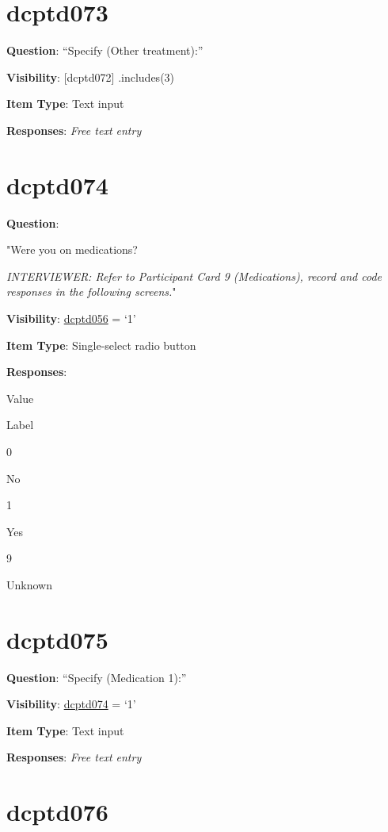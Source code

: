 \documentclass[]{book}
\begin{document}
\hypertarget{dcptd073}{%
\section{dcptd073}\label{dcptd073}}

\textbf{Question}: ``Specify (Other treatment):''

\textbf{Visibility}: {[}dcptd072{]} .includes(3)

\textbf{Item Type}: Text input

\textbf{Responses}: \emph{Free text entry}

\hypertarget{dcptd074}{%
\section{dcptd074}\label{dcptd074}}

\textbf{Question}:

"Were you on medications?

\emph{INTERVIEWER: Refer to Participant Card 9 (Medications), record and code responses in the following screens.}"

\textbf{Visibility}: \protect\hyperlink{dcptd056}{dcptd056} = `1'

\textbf{Item Type}: Single-select radio button

\textbf{Responses}:

Value

Label

0

No

1

Yes

9

Unknown

\hypertarget{dcptd075}{%
\section{dcptd075}\label{dcptd075}}

\textbf{Question}: ``Specify (Medication 1):''

\textbf{Visibility}: \protect\hyperlink{dcptd074}{dcptd074} = `1'

\textbf{Item Type}: Text input

\textbf{Responses}: \emph{Free text entry}

\hypertarget{dcptd076}{%
\section{dcptd076}\label{dcptd076}}
\end{document}

